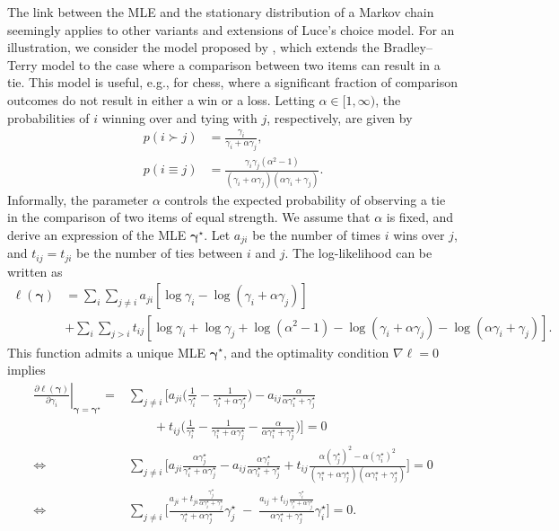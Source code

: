 The link between the MLE and the stationary distribution of a Markov chain seemingly applies to other variants and extensions of Luce's choice model.
For an illustration, we consider the model proposed by \citet{rao1967ties}, which extends the Bradley--Terry model to the case where a comparison between two items can result in a tie.
This model is useful, e.g., for chess, where a significant fraction of comparison outcomes do not result in either a win or a loss.
Letting $\alpha \in [1, \infty)$, the probabilities of $i$ winning over and tying with $j$, respectively, are given by
\begin{align*}
p(i \succ j) &= \frac{\gamma_i}{\gamma_i + \alpha \gamma_j}, \\
p(i \equiv j) &= \frac{\gamma_i \gamma_j(\alpha^2 - 1)}{(\gamma_i + \alpha\gamma_j)(\alpha \gamma_i + \gamma_j)}.
\end{align*}
Informally, the parameter $\alpha$ controls the expected probability of observing a tie in the comparison of two items of equal strength.
We assume that $\alpha$ is fixed, and derive an expression of the MLE $\bm{\gamma}^\star$.
Let $a_{ji}$ be the number of times $i$ wins over $j$, and $t_{ij} = t_{ji}$ be the number of ties between $i$ and $j$.
The log-likelihood can be written as
\begin{align*}
\ell(\bm{\gamma}) &=
  \sum_i \sum_{j \ne i}
  a_{ji} \left[ \log \gamma_i - \log(\gamma_i + \alpha \gamma_j) \right] \\
    &+ \sum_i \sum_{j > i}
    t_{ij} \left[ \log \gamma_i + \log \gamma_j  + \log(\alpha^2 - 1)
     - \log(\gamma_i + \alpha \gamma_j) - \log(\alpha \gamma_i + \gamma_j) \right].
\end{align*}
This function admits a unique MLE $\bm{\gamma}^\star$, and the optimality condition $\nabla \ell = 0$ implies
\begin{align*}
\left. \frac{\partial \ell(\bm{\gamma})}{\partial \gamma_i} \right\rvert_{\bm{\gamma}= \bm{\gamma}^\star}
    = &\sum_{j \ne i} \Bigg[ a_{ji} \bigg( \frac{1}{\gamma^\star_i} - \frac{1}{\gamma^\star_i + \alpha \gamma^\star_j} \bigg)
      - a_{ij} \frac{\alpha}{\alpha \gamma^\star_i + \gamma^\star_j} \\
      & \qquad {} + t_{ij} \bigg( \frac{1}{\gamma^\star_i} - \frac{1}{\gamma^\star_i + \alpha \gamma^\star_j} - \frac{\alpha}{\alpha \gamma^\star_i + \gamma^\star_j} \bigg) \Bigg] = 0 \\
    \iff & \sum_{j \ne i} \Bigg[ a_{ji} \frac{\alpha \gamma^\star_j}{\gamma^\star_i + \alpha \gamma^\star_j}
      - a_{ij} \frac{\alpha \gamma^\star_i}{\alpha \gamma^\star_i + \gamma^\star_j}
      + t_{ij} \frac{\alpha (\gamma^\star_j)^2 - \alpha (\gamma^\star_i)^2}{(\gamma^\star_i + \alpha \gamma^\star_j)(\alpha \gamma^\star_i + \gamma^\star_j)} \Bigg] = 0 \\
    \iff & \sum_{j \ne i} \Bigg[ \frac{a_{ji} + t_{ji}\tfrac{\gamma^\star_j}{\alpha \gamma^\star_i + \gamma^\star_j}}{\gamma^\star_i + \alpha \gamma^\star_j} \gamma^\star_j
      \; - \; \frac{a_{ij} + t_{ij}\tfrac{\gamma^\star_i}{\gamma^\star_i + \alpha \gamma^\star_j}}{\alpha \gamma^\star_i + \gamma^\star_j} \gamma^\star_i \Bigg] = 0.
\end{align*}
